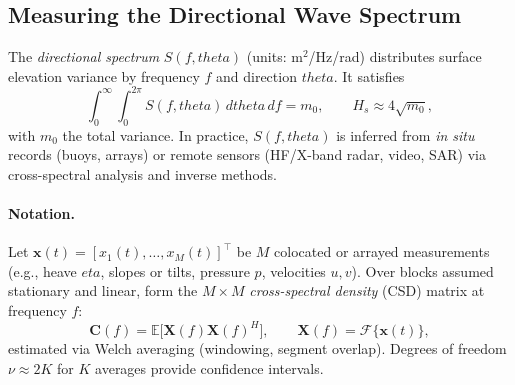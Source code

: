 \documentclass[journal,10pt,twocolumn]{IEEEtran}
\def\eta{eta}%
\def\theta{theta}%
\def\mathrm#1{#1}%
\begin{document}
    \subsection{Measuring the Directional Wave Spectrum}
    \label{subsec:measure-directional-spectrum}

    The \emph{directional spectrum} $S(f,\theta)$ (units: m$^2$/Hz/rad) distributes surface elevation variance by frequency $f$ and direction $\theta$. It satisfies
    \begin{equation}
        \int_{0}^{\infty}\int_{0}^{2\pi} S(f,\theta)\,d\theta\,df
        = m_0,
        \qquad H_s \approx 4\sqrt{m_0},
    \end{equation}
    with $m_0$ the total variance. In practice, $S(f,\theta)$ is inferred from \emph{in situ} records (buoys, arrays) or remote sensors (HF/X-band radar, video, SAR) via cross-spectral analysis and inverse methods.

    \paragraph{Notation.}
    Let $\mathbf{x}(t) = [x_1(t),\ldots,x_M(t)]^\top$ be $M$ colocated or arrayed measurements (e.g., heave $\eta$, slopes or tilts, pressure $p$, velocities $u,v$). Over blocks assumed stationary and linear, form the $M\times M$ \emph{cross-spectral density} (CSD) matrix at frequency $f$:
    \begin{equation}
        \mathbf{C}(f)
        = \mathbb{E}\big[ \mathbf{X}(f)\mathbf{X}(f)^{\mathrm{H}} \big],
        \qquad \mathbf{X}(f)=\mathcal{F}\{\mathbf{x}(t)\},
    \end{equation}
    estimated via Welch averaging (windowing, segment overlap). Degrees of freedom $\nu \approx 2K$ for $K$ averages provide confidence intervals.
\end{document}
